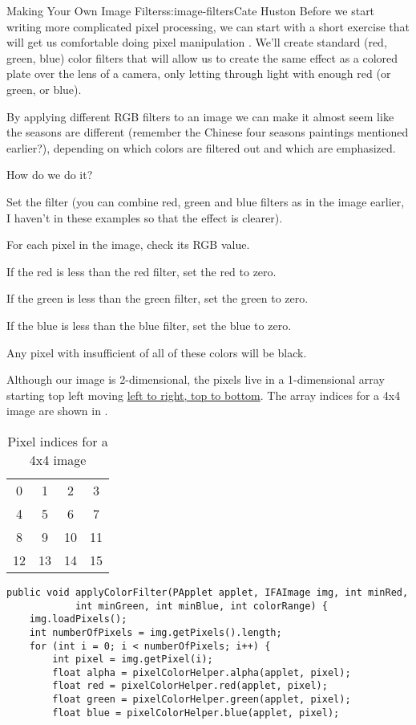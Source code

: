 \begin{aosachapter}{Making Your Own Image Filters}{s:image-filters}{Cate Huston}
Before we start writing more complicated pixel processing, we can start
with a short exercise that will get us comfortable doing pixel
manipulation . We'll create standard (red, green, blue) color filters
that will allow us to create the same effect as a colored plate over the
lens of a camera, only letting through light with enough red (or green,
or blue).

By applying different RGB filters to an image we can make it almost seem
like the seasons are different (remember the Chinese four seasons
paintings mentioned earlier?), depending on which colors are filtered
out and which are emphasized.

How do we do it?

\begin{aosaitemize}
\item
  Set the filter (you can combine red, green and blue filters as in the
  image earlier, I haven't in these examples so that the effect is
  clearer).
\item
  For each pixel in the image, check its RGB value.
\item
  If the red is less than the red filter, set the red to zero.
\item
  If the green is less than the green filter, set the green to zero.
\item
  If the blue is less than the blue filter, set the blue to zero.
\item
  Any pixel with insufficient of all of these colors will be black.
\end{aosaitemize}

Although our image is 2-dimensional, the pixels live in a 1-dimensional
array starting top left moving
\href{https://processing.org/tutorials/pixels/}{left to right, top to
bottom}. The array indices for a 4x4 image are shown in .

\begin{table}
\centering
{\footnotesize
{}
\begin{tabular}{cccc}
\hline
0 & 1 & 2 & 3 \\
4 & 5 & 6 & 7 \\
8 & 9 & 10 & 11 \\
12 & 13 & 14 & 15 \\
\hline
\end{tabular}
}
\caption{Pixel indices for a 4x4 image}
\label{500l.imagefilters.pixelindices}
\end{table}

\begin{verbatim}
public void applyColorFilter(PApplet applet, IFAImage img, int minRed,
            int minGreen, int minBlue, int colorRange) {    
    img.loadPixels();
    int numberOfPixels = img.getPixels().length;
    for (int i = 0; i < numberOfPixels; i++) {
        int pixel = img.getPixel(i);
        float alpha = pixelColorHelper.alpha(applet, pixel);
        float red = pixelColorHelper.red(applet, pixel);
        float green = pixelColorHelper.green(applet, pixel);
        float blue = pixelColorHelper.blue(applet, pixel);
            

\end{verbatim}
\end{aosachapter}
